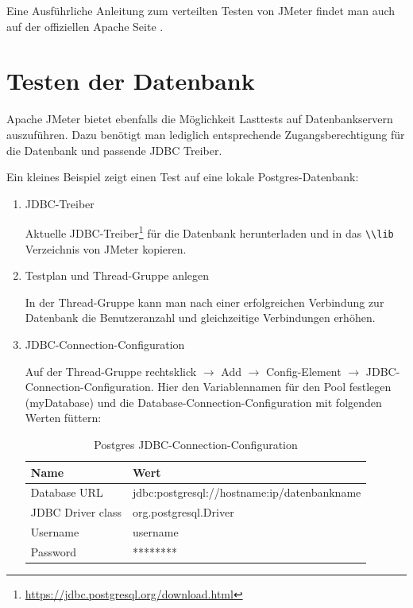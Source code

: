 \documentclass[a4paper,12pt]{article}
\newcommand{\codeInLine}[1]{%
\colorbox{graybackgroundColor}{\lstinline{#1}} %
}
\begin{document}
Eine Ausführliche Anleitung zum verteilten Testen von JMeter findet man auch auf der offiziellen Apache Seite \cite{online:apache_distributed}.

\section{Testen der Datenbank}
Apache JMeter bietet ebenfalls die Möglichkeit Lasttests auf Datenbankservern auszuführen. Dazu benötigt man lediglich entsprechende Zugangsberechtigung für die Datenbank und passende JDBC Treiber. 

Ein kleines Beispiel zeigt einen Test auf eine lokale Postgres-Datenbank:

\begin{enumerate}
	\item JDBC-Treiber
		
	Aktuelle JDBC-Treiber\footnote{\url{https://jdbc.postgresql.org/download.html}} für die Datenbank herunterladen und in das \codeInLine{\\lib} Verzeichnis von JMeter kopieren. 
	
	\item Testplan und Thread-Gruppe anlegen
	
	In der Thread-Gruppe kann man nach einer erfolgreichen Verbindung zur Datenbank die Benutzeranzahl und gleichzeitige Verbindungen erhöhen.
	
	\item JDBC-Connection-Configuration
	
	Auf der Thread-Gruppe rechtsklick $\rightarrow$ Add $\rightarrow$ Config-Element $\rightarrow$ JDBC-Connection-Configuration. Hier den Variablennamen für den Pool festlegen (myDatabase) und die Database-Connection-Config\-uration mit folgenden Werten füttern:
	
	\begin{table}[H]
	\centering
	\begin{tabular}{|l|l|}
		\hline
		\textbf{Name} & \textbf{Wert} \\
		\hline
		Database URL & jdbc:postgresql://hostname:ip/datenbankname \\
		JDBC Driver class & org.postgresql.Driver \\
		Username & username \\
		Password & ******** \\
		\hline
	\end{tabular}
	\caption[tab_jdbc_values]{Postgres JDBC-Connection-Configuration}
	\label{tab_jdbc_values}
\end{table}
	

\end{enumerate}
\end{document}
